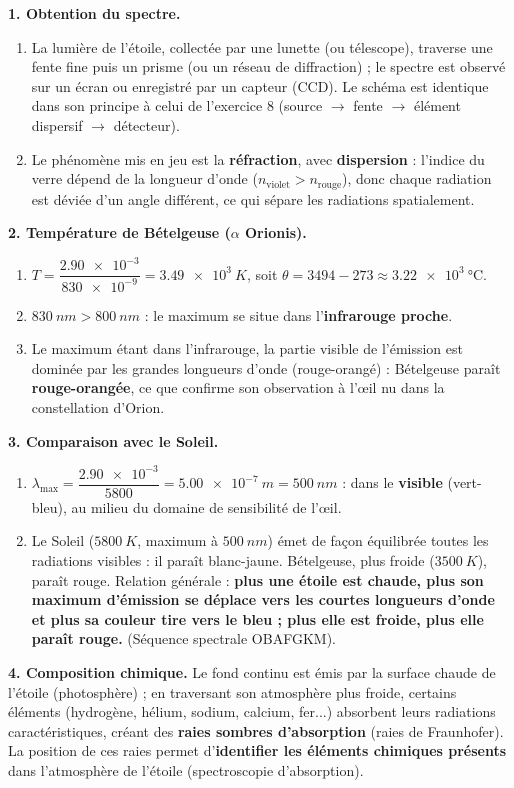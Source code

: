 \documentclass[11pt]{article}
\begin{document}
\begin{corrige}
\textbf{1. Obtention du spectre.}
\begin{enumerate}
\item La lumière de l'étoile, collectée par une lunette (ou télescope), traverse une fente fine puis un prisme (ou un réseau de diffraction) ; le spectre est observé sur un écran ou enregistré par un capteur (CCD). Le schéma est identique dans son principe à celui de l'exercice 8 (source $\to$ fente $\to$ élément dispersif $\to$ détecteur).
\item Le phénomène mis en jeu est la \textbf{réfraction}, avec \textbf{dispersion} : l'indice du verre dépend de la longueur d'onde ($n_{\text{violet}} > n_{\text{rouge}}$), donc chaque radiation est déviée d'un angle différent, ce qui sépare les radiations spatialement.
\end{enumerate}
\textbf{2. Température de Bételgeuse ($\alpha$ Orionis).}
\begin{enumerate}
\item $T = \dfrac{\num{2,90e-3}}{\num{830e-9}} = \SI{3,49e3}{K}$, soit $\theta = 3494 - 273 \approx \SI{3,22e3}{\celsius}$.
\item $\SI{830}{nm} > \SI{800}{nm}$ : le maximum se situe dans l'\textbf{infrarouge proche}.
\item Le maximum étant dans l'infrarouge, la partie visible de l'émission est dominée par les grandes longueurs d'onde (rouge-orangé) : Bételgeuse paraît \textbf{rouge-orangée}, ce que confirme son observation à l'œil nu dans la constellation d'Orion.
\end{enumerate}
\textbf{3. Comparaison avec le Soleil.}
\begin{enumerate}
\item $\lambda_{\max} = \dfrac{\num{2,90e-3}}{5800} = \SI{5,00e-7}{m} = \SI{500}{nm}$ : dans le \textbf{visible} (vert-bleu), au milieu du domaine de sensibilité de l'œil.
\item Le Soleil ($\SI{5800}{K}$, maximum à $\SI{500}{nm}$) émet de façon équilibrée toutes les radiations visibles : il paraît blanc-jaune. Bételgeuse, plus froide ($\SI{3500}{K}$), paraît rouge. Relation générale : \textbf{plus une étoile est chaude, plus son maximum d'émission se déplace vers les courtes longueurs d'onde et plus sa couleur tire vers le bleu ; plus elle est froide, plus elle paraît rouge.} (Séquence spectrale OBAFGKM).
\end{enumerate}
\textbf{4. Composition chimique.} Le fond continu est émis par la surface chaude de l'étoile (photosphère) ; en traversant son atmosphère plus froide, certains éléments (hydrogène, hélium, sodium, calcium, fer...) absorbent leurs radiations caractéristiques, créant des \textbf{raies sombres d'absorption} (raies de Fraunhofer). La position de ces raies permet d'\textbf{identifier les éléments chimiques présents} dans l'atmosphère de l'étoile (spectroscopie d'absorption).


\end{corrige}
\end{document}
